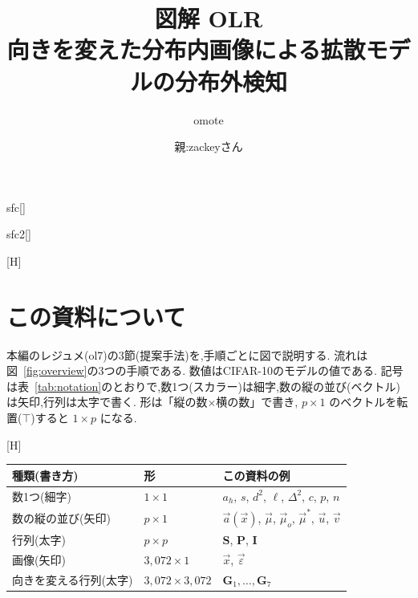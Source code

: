 \documentclass[MIRU,submit,onecolumn]{miru2025j}
\makeatletter
\newcommand{\Ours}{OLR}
\newcommand{\vmu}{\vec{\mu}}\newcommand{\va}{\vec{a}}\newcommand{\vx}{\vec{x}}\newcommand{\vu}{\vec{u}}\newcommand{\vv}{\vec{v}}
\newcommand{\Pm}{\mathbf{P}}\newcommand{\Sm}{\mathbf{S}}\newcommand{\Id}{\mathbf{I}}\newcommand{\Gm}{\mathbf{G}}
\renewenvironment{figure}{\@floatenv\capwidth\textwidth\ecapwidth\textwidth\abovecaptionskip1mm\belowcaptionskip\z@\@float{figure}}{\end@float}
\renewenvironment{table}{\@floatenv\capwidth\textwidth\ecapwidth\textwidth\abovecaptionskip\z@\belowcaptionskip1mm\@float{table}}{\end@float}
\makeatother
\begin{document}
\title{\textbf{図解 \Ours{}\\向きを変えた分布内画像による拡散モデルの分布外検知}}
\author{omote}{}{sfc}[]
\author{親:zackeyさん}{}{sfc2}[]
\maketitle

\begin{figure}[H]\centering

\caption{\Ours{}の流れ. 1：画像1枚から数を $p$ 個とる(2節). 2：分布内の画像と,その向きを変えた画像から基準点 $\vmu^{*}$ を決める(3節,4節. 事前に1回だけ). 3：テスト画像の $p$ 個の数から $\vmu^{*}$ までの距離を測り,スコア $s(\vx)$(数1つ)とする(4節,5節). 2と3の配置は模式図で,縮尺どおりの図は図~\ref{fig:space}.}
\label{fig:overview}
\end{figure}

\section{この資料について}
本編のレジュメ(ol7)の3節(提案手法)を,手順ごとに図で説明する. 流れは図~\ref{fig:overview}の3つの手順である. 数値はCIFAR-10のモデルの値である. 記号は表~\ref{tab:notation}のとおりで,数1つ(スカラー)は細字,数の縦の並び(ベクトル)は矢印,行列は太字で書く. 形は「縦の数$\times$横の数」で書き, $p\times 1$ のベクトルを転置($\top$)すると $1\times p$ になる.

\begin{table}[H]\centering\footnotesize\setlength{\tabcolsep}{8pt}\renewcommand{\arraystretch}{1.15}
\caption{記号の約束(形はCIFAR-10で $p=23$ のとき).}
\label{tab:notation}
\begin{tabular}{@{}lll@{}}\toprule
種類(書き方) & 形 & この資料の例\\\midrule
数1つ(細字) & $1\times 1$ & $a_{h}$, $s$, $d^{2}$, $\ell$, $\Delta^{2}$, $c$, $p$, $n$\\
数の縦の並び(矢印) & $p\times 1$ & $\va(\vx)$, $\vmu$, $\vmu_{o}$, $\vmu^{*}$, $\vu$, $\vv$\\
行列(太字) & $p\times p$ & $\Sm$, $\Pm$, $\Id$\\
画像(矢印) & $3{,}072\times 1$ & $\vx$, $\vec{\varepsilon}$\\
向きを変える行列(太字) & $3{,}072\times 3{,}072$ & $\Gm_{1},\dots,\Gm_{7}$\\\bottomrule
\end{tabular}
\end{table}
\end{document}
